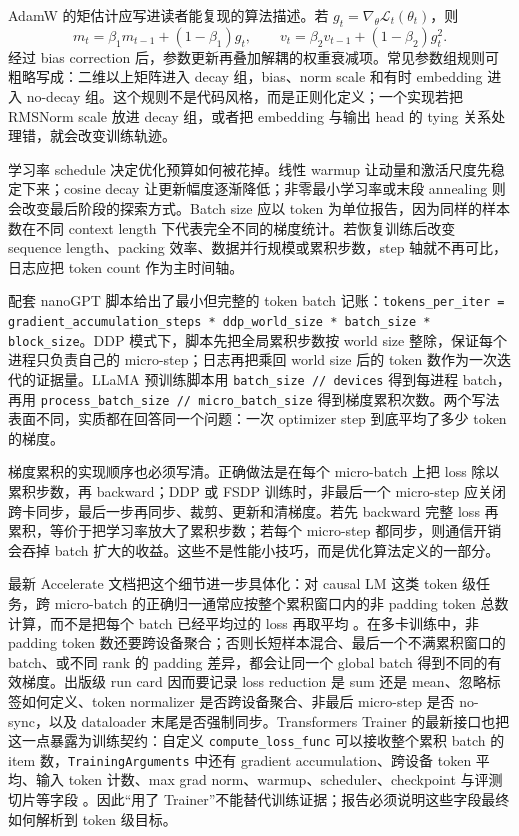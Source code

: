 \documentclass[UTF8,zihao=-4,openany]{ctexbook}
\begin{document}
AdamW 的矩估计应写进读者能复现的算法描述。若 $g_t=\nabla_\theta\mathcal{L}_t(\theta_t)$，则
\[
  m_t=\beta_1m_{t-1}+(1-\beta_1)g_t,\qquad
  v_t=\beta_2v_{t-1}+(1-\beta_2)g_t^2 .
\]
经过 bias correction 后，参数更新再叠加解耦的权重衰减项。常见参数组规则可粗略写成：二维以上矩阵进入 decay 组，bias、norm scale 和有时 embedding 进入 no-decay 组。这个规则不是代码风格，而是正则化定义；一个实现若把 RMSNorm scale 放进 decay 组，或者把 embedding 与输出 head 的 tying 关系处理错，就会改变训练轨迹。

学习率 schedule 决定优化预算如何被花掉。线性 warmup 让动量和激活尺度先稳定下来；cosine decay 让更新幅度逐渐降低；非零最小学习率或末段 annealing 则会改变最后阶段的探索方式。Batch size 应以 token 为单位报告，因为同样的样本数在不同 context length 下代表完全不同的梯度统计。若恢复训练后改变 sequence length、packing 效率、数据并行规模或累积步数，step 轴就不再可比，日志应把 token count 作为主时间轴。

配套 nanoGPT 脚本给出了最小但完整的 token batch 记账：\texttt{tokens\_per\_iter = gradient\_accumulation\_steps * ddp\_world\_size * batch\_size * block\_size}。DDP 模式下，脚本先把全局累积步数按 world size 整除，保证每个进程只负责自己的 micro-step；日志再把乘回 world size 后的 token 数作为一次迭代的证据量。LLaMA 预训练脚本用 \texttt{batch\_size // devices} 得到每进程 batch，再用 \texttt{process\_batch\_size // micro\_batch\_size} 得到梯度累积次数。两个写法表面不同，实质都在回答同一个问题：一次 optimizer step 到底平均了多少 token 的梯度。

梯度累积的实现顺序也必须写清。正确做法是在每个 micro-batch 上把 loss 除以累积步数，再 backward；DDP 或 FSDP 训练时，非最后一个 micro-step 应关闭跨卡同步，最后一步再同步、裁剪、更新和清梯度。若先 backward 完整 loss 再累积，等价于把学习率放大了累积步数；若每个 micro-step 都同步，则通信开销会吞掉 batch 扩大的收益。这些不是性能小技巧，而是优化算法定义的一部分。

最新 Accelerate 文档把这个细节进一步具体化：对 causal LM 这类 token 级任务，跨 micro-batch 的正确归一通常应按整个累积窗口内的非 padding token 总数计算，而不是把每个 batch 已经平均过的 loss 再取平均 \cite{huggingface2026accelerategradaccum}。在多卡训练中，非 padding token 数还要跨设备聚合；否则长短样本混合、最后一个不满累积窗口的 batch、或不同 rank 的 padding 差异，都会让同一个 global batch 得到不同的有效梯度。出版级 run card 因而要记录 loss reduction 是 sum 还是 mean、忽略标签如何定义、token normalizer 是否跨设备聚合、非最后 micro-step 是否 no-sync，以及 dataloader 末尾是否强制同步。Transformers Trainer 的最新接口也把这一点暴露为训练契约：自定义 \texttt{compute\_loss\_func} 可以接收整个累积 batch 的 item 数，\texttt{TrainingArguments} 中还有 gradient accumulation、跨设备 token 平均、输入 token 计数、max grad norm、warmup、scheduler、checkpoint 与评测切片等字段 \cite{huggingface2026transformerstrainer}。因此“用了 Trainer”不能替代训练证据；报告必须说明这些字段最终如何解析到 token 级目标。
\end{document}

